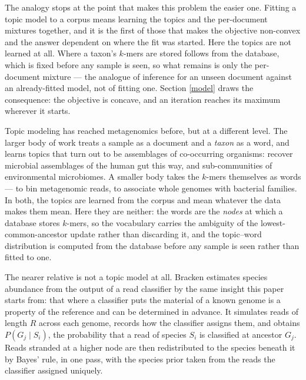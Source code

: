 \documentclass[pdflatex,sn-vancouver-num]{sn-jnl}
\begin{document}
    The analogy stops at the point that makes this problem the easier one. Fitting a topic model to a
    corpus means learning the topics and the per-document mixtures together, and it is the first of
    those that makes the objective non-convex and the answer dependent on where the fit was started.
    Here the topics are not learned at all. Where a taxon's $k$-mers are stored follows from the
    database, which is fixed before any sample is seen, so what remains is only the per-document
    mixture --- the analogue of inference for an unseen document against an already-fitted model,
    not of fitting one. Section \ref{model} draws the consequence: the objective is concave, and an
    iteration reaches its maximum wherever it starts.

    Topic modeling has reached metagenomics before, but at a different level. The larger body of work
    treats a sample as a document and a \emph{taxon} as a word, and learns topics that turn out to be
    assemblages of co-occurring organisms: \citet{hosoda2020assemblage} recover microbial assemblages
    of the human gut this way, and \citet{kim2023environmental} sub-communities of environmental
    microbiomes. A smaller body takes the $k$-mers themselves as words ---
    \citet{zhang2015binning} to bin metagenomic reads, \citet{borrayo2020kmertopic} to associate
    whole genomes with bacterial families. In both, the topics are learned from the corpus and mean
    whatever the data makes them mean. Here they are
    neither: the words are the \emph{nodes} at which a database stores $k$-mers, so the vocabulary
    carries the ambiguity of the lowest-common-ancestor update rather than discarding it, and the
    topic--word distribution is computed from the database before any sample is seen rather than
    fitted to one.

    The nearer relative is not a topic model at all. Bracken \citep{lu2017bracken} estimates species
    abundance from the output of a read classifier by the same insight this paper starts from: that
    where a classifier puts the material of a known genome is a property of the reference and can be
    determined in advance. It simulates reads of length $R$ across each genome, records how the
    classifier assigns them, and obtains $P(G_j \mid S_i)$, the probability that a read of species
    $S_i$ is classified at ancestor $G_j$. Reads stranded at a higher node are then redistributed to
    the species beneath it by Bayes' rule, in one pass, with the species prior taken from the reads
    the classifier assigned uniquely.
\end{document}
